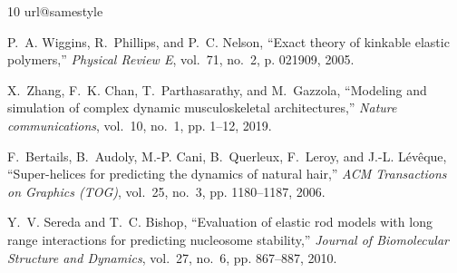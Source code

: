 \documentclass[letterpaper, 10 pt, conference]{ieeeconf}  %
\begin{document}
\addtolength{\textheight}{-0cm}   %

\begin{thebibliography}{10}
	\providecommand{\url}[1]{#1}
	\csname url@samestyle\endcsname
	\providecommand{\newblock}{\relax}
	\providecommand{\bibinfo}[2]{#2}
	\providecommand{\BIBentrySTDinterwordspacing}{\spaceskip=0pt\relax}
	\providecommand{\BIBentryALTinterwordstretchfactor}{4}
	\providecommand{\BIBentryALTinterwordspacing}{\spaceskip=\fontdimen2\font plus
		\BIBentryALTinterwordstretchfactor\fontdimen3\font minus
		\fontdimen4\font\relax}
	\providecommand{\BIBforeignlanguage}[2]{{%
			\expandafter\ifx\csname l@#1\endcsname\relax
			\typeout{** WARNING: IEEEtran.bst: No hyphenation pattern has been}%
			\typeout{** loaded for the language `#1'. Using the pattern for}%
			\typeout{** the default language instead.}%
			\else
			\language=\csname l@#1\endcsname
			\fi
			#2}}
	\providecommand{\BIBdecl}{\relax}
	\BIBdecl
	
	P.~A. Wiggins, R.~Phillips, and P.~C. Nelson, ``Exact theory of kinkable
	elastic polymers,'' \emph{Physical Review E}, vol.~71, no.~2, p. 021909,
	2005.
	
	X.~Zhang, F.~K. Chan, T.~Parthasarathy, and M.~Gazzola, ``Modeling and
	simulation of complex dynamic musculoskeletal architectures,'' \emph{Nature
		communications}, vol.~10, no.~1, pp. 1--12, 2019.
	
	F.~Bertails, B.~Audoly, M.-P. Cani, B.~Querleux, F.~Leroy, and J.-L.
	L{\'e}v{\^e}que, ``Super-helices for predicting the dynamics of natural
	hair,'' \emph{ACM Transactions on Graphics (TOG)}, vol.~25, no.~3, pp.
	1180--1187, 2006.
	
	Y.~V. Sereda and T.~C. Bishop, ``Evaluation of elastic rod models with long
	range interactions for predicting nucleosome stability,'' \emph{Journal of
		Biomolecular Structure and Dynamics}, vol.~27, no.~6, pp. 867--887, 2010.
	

\end{thebibliography}
\end{document}
